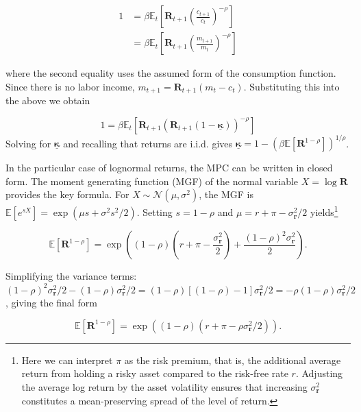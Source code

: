 \documentclass[preprint,authoryear]{elsarticle}
\newcommand{\mNrm}{m}
\newcommand{\cNrm}{c}
\newcommand{\CRRA}{\rho}
\newcommand{\DiscFac}{\beta}
\newcommand{\Ex}{\mathbf{\mathbb{E}}}
\newcommand{\MPC}{\boldsymbol{\kappa}}
\newcommand{\MPCmin}{\underline{\MPC}}
\newcommand{\Nrml}{\mathcal{N}}
\newcommand{\std}{\sigma}
\newcommand{\risky}{\mathbf{r}}
\newcommand{\Risky}{\mathbf{R}}
\newcommand{\equityPrem}{\pi}
\begin{document}
\begin{equation}
\label{eq:stochReturnsEulerEqn}
\begin{aligned}
1 &= \DiscFac \Ex_t\left[\Risky_{t+1} \left(\frac{\cNrm_{t+1}}{\cNrm_t}\right)^{-\CRRA}\right]\\
&= \DiscFac \Ex_t\left[\Risky_{t+1} \left(\frac{\mNrm_{t+1}}{\mNrm_t}\right)^{-\CRRA}\right]
\end{aligned}
\end{equation}

where the second equality uses the assumed form of the consumption function.  Since there is no labor income, $\mNrm_{t+1} = \Risky_{t+1}(\mNrm_t - \cNrm_t)$.  Substituting this into the above we obtain

\begin{equation}
\label{eq:stochReturnsEulerEqnContd}
1 = \DiscFac \Ex_t\left[\Risky_{t+1} \left(\Risky_{t+1}(1-\MPCmin)\right)^{-\CRRA}\right]
\end{equation}
Solving for $\MPCmin$ and recalling that returns are i.i.d. gives $\MPCmin=1 - (\DiscFac \Ex[\Risky^{1 -\CRRA}])^{1/\CRRA}$.

In the particular case of lognormal returns, the MPC can be written in closed form.  The moment generating function (MGF) of the normal variable $X = \log \Risky$ provides the key formula. For $X \sim \Nrml(\mu, \sigma^2)$, the MGF is $\Ex[e^{sX}] = \exp(\mu s + \sigma^2 s^2/2)$. Setting $s = 1 -\CRRA$ and $\mu = r + \equityPrem - \std_{\risky}^2/2$ yields\footnote{Here we can interpret $\equityPrem$ as the risk premium, that is, the additional average return from holding a risky asset compared to the risk-free rate $r$.  Adjusting the average log return by the asset volatility ensures that increasing $\std_{\risky}^2$ constitutes a mean-preserving spread of the level of return.}

\begin{equation}
\Ex[\Risky^{1-\CRRA}] = \exp\left((1-\CRRA)\left(r+\equityPrem - \frac{\std_{\risky}^2}{2}\right) + \frac{(1-\CRRA)^2\std_{\risky}^2}{2}\right).
\end{equation}

Simplifying the variance terms: $(1 -\CRRA)^2\std_{\risky}^2/2 - (1 -\CRRA)\std_{\risky}^2/2 = (1 -\CRRA)[(1 -\CRRA) -1]\std_{\risky}^2/2 = -\CRRA(1 -\CRRA)\std_{\risky}^2/2$, giving the final form

\begin{equation}
\Ex[\Risky^{1-\CRRA}] = \exp\left((1-\CRRA)\left(r+\equityPrem - \CRRA\std_{\risky}^2/2\right)\right).
\end{equation}
\end{document}
